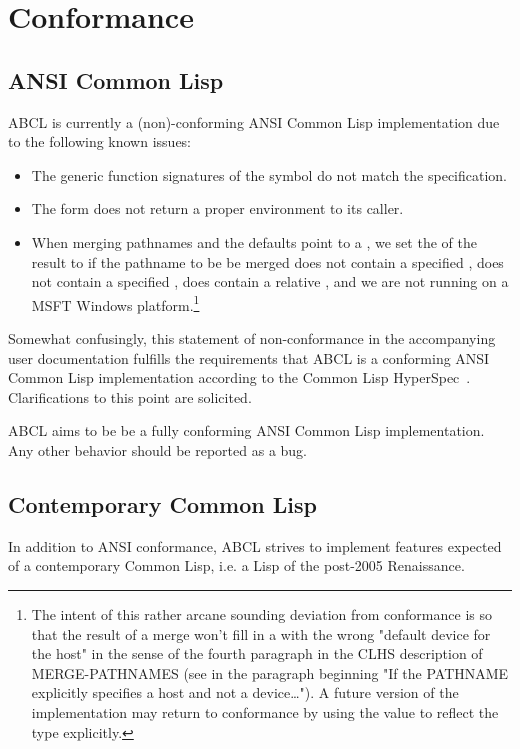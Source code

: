 \documentclass[10pt]{book}
\begin{document}
\section{Conformance}
\label{section:conformance}

\subsection{ANSI Common Lisp}
\textsc{ABCL} is currently a (non)-conforming \textsc{ANSI} Common Lisp
implementation due to the following known issues:

\begin{itemize}
\item The generic function signatures of the  symbol
  do not match the specification.
\item The  form does not return a proper 
  environment to its caller.
\item When merging pathnames and the defaults point to a ,
  we set the  of the result to  if the pathname to be
  be merged does not contain a specified , does not contain a
  specified , does contain a relative , and we are
  not running on a \textsc{MSFT} Windows platform.\footnote{The intent of this
    rather arcane sounding deviation from conformance is so that the
    result of a merge won't fill in a  with the wrong "default
    device for the host" in the sense of the fourth paragraph in the
    \textsc{CLHS} description of MERGE-PATHNAMES (see in \cite{CLHS} the paragraph beginning
    "If the PATHNAME explicitly specifies a host and not a device…").
    A future version of the implementation may return to conformance
    by using the  value to reflect the type explicitly.
  }

\end{itemize}

Somewhat confusingly, this statement of non-conformance in the
accompanying user documentation fulfills the requirements that
\textsc{ABCL} is a conforming ANSI Common Lisp implementation according
to the Common Lisp HyperSpec~\cite{CLHS}.  Clarifications to this point
are solicited.

\textsc{ABCL} aims to be be a fully conforming \textsc{ANSI} Common Lisp implementation.
Any other behavior should be reported as a bug.

\subsection{Contemporary Common Lisp}
In addition to \textsc{ANSI} conformance, \textsc{ABCL} strives to implement
features expected of a contemporary Common Lisp, i.e. a Lisp of the
post-2005 Renaissance.
\end{document}
